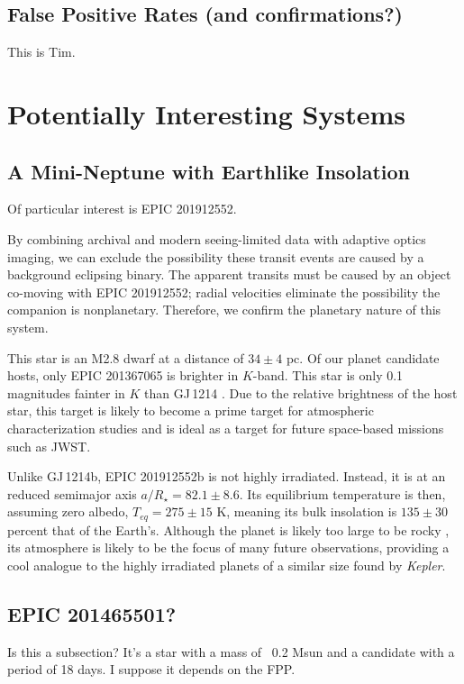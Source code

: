\documentclass{emulateapj}
\newcommand{\ars}{{$a/R_{\star}$}}
\newcommand{\project}[1]{\textsl{#1}}
\newcommand{\kep}{\project{Kepler}}
\begin{document}
\subsection{False Positive Rates (and confirmations?)}
This is Tim.

\section{Potentially Interesting Systems}
\subsection{A Mini-Neptune with Earthlike Insolation}

Of particular interest is EPIC 201912552.

By combining archival and modern seeing-limited data with adaptive optics
imaging, we can exclude the possibility these transit events are caused by
a background eclipsing binary.
The apparent transits must be caused by an object co-moving with EPIC 201912552;
radial velocities eliminate the possibility the companion is nonplanetary.
Therefore, we confirm the planetary nature of this system.

This star is an M2.8 dwarf at a distance of $34\pm4$ pc.
Of our planet candidate hosts, only EPIC 201367065 \citep[originally
discovered by][]{Crossfield15} is brighter in $K$-band.
This star is only 0.1 magnitudes fainter in $K$ than GJ\,1214
\citep{Charbonneau09}.
Due to the relative brightness of the host star, this target is likely
to become a prime target for atmospheric characterization studies
and is ideal as a target for future space-based missions such as JWST.

Unlike GJ\,1214b, EPIC 201912552b is not highly irradiated.
Instead, it is at an reduced semimajor axis \ars$ = 82.1 \pm 8.6$.
Its equilibrium temperature is then, assuming zero albedo, $T_{eq} = 275 \pm 15$
K, meaning its bulk insolation is $135 \pm 30$ percent that of the Earth's.
Although the planet is likely too large to be rocky \citep{Rogers14},
its atmosphere is likely to be the focus of many future observations, providing
a cool analogue to the highly irradiated planets of a similar size found by
\kep.



\subsection{EPIC 201465501?}
Is this a subsection? It's a star with a mass of ~0.2 Msun and a candidate with
a period of 18 days. I suppose it depends on the FPP.
\end{document}
